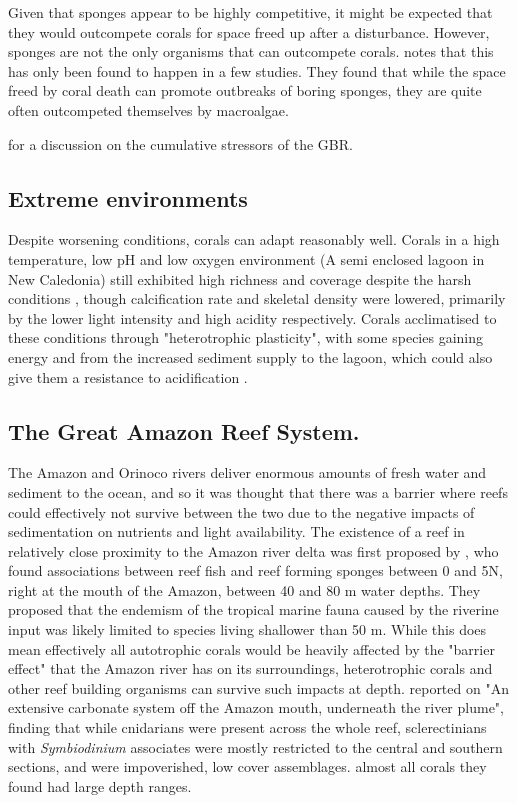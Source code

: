 \documentclass[11pt,a4paper]{article}
\begin{document}
Given that sponges appear to be highly competitive, it might be expected that they would outcompete corals for space freed up after a disturbance. However, sponges are not the only organisms that can outcompete corals.  \cite{Gonzalez2016} notes that this has only been found to happen in a few studies. They found that while the space freed by coral death can promote outbreaks of boring sponges, they are quite often outcompeted themselves by macroalgae.

\cite{Ortiz2018} for a discussion on the cumulative stressors of the GBR.

\subsection{Extreme environments}
Despite worsening conditions, corals can adapt reasonably well. Corals in a high temperature, low pH and low oxygen environment (A semi enclosed lagoon in New Caledonia) still exhibited high richness and coverage despite the harsh conditions \citep{Camp2017}, though calcification rate and skeletal density were lowered, primarily by the lower light intensity and high acidity respectively. Corals acclimatised to these conditions through "heterotrophic plasticity", with some species gaining energy and from the increased sediment supply to the lagoon, which could also give them a resistance to acidification \citep{Ramajo2016}. 



\subsection{The Great Amazon Reef System.}

The Amazon and Orinoco rivers deliver enormous amounts of fresh water and sediment to the ocean, and so it was thought that there was a barrier where reefs could effectively not survive between the two due to the negative impacts of sedimentation on nutrients and light availability. The existence of a reef in relatively close proximity to the Amazon river delta was first proposed by \cite{collette1977}, who found associations between reef fish and reef forming sponges between 0 and 5\textdegree N, right at the mouth of the Amazon, between 40 and 80 m water depths. They proposed that the endemism of the tropical marine fauna caused by the riverine input was likely limited to species living shallower than 50 m. While this does mean effectively all autotrophic corals would be heavily affected by the "barrier effect" that the Amazon river has on its surroundings, heterotrophic corals and other reef building organisms can survive such impacts at depth. \cite{Moura2016} reported on "An extensive carbonate system off the Amazon mouth, underneath the river plume", finding that while cnidarians were present across the whole reef, sclerectinians with \textit{Symbiodinium} associates were mostly restricted to the central and southern sections, and were impoverished, low cover assemblages. almost all corals they found had large depth ranges.
\end{document}
